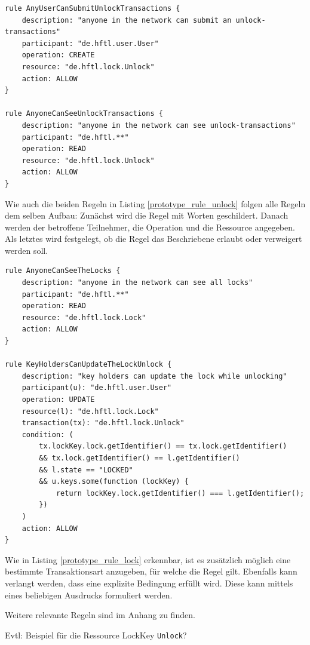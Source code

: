             \medskip
            \begin{lstlisting}[caption={Auszug aus den Regeln für die Transaktion \colorbox{light-gray}{\lstinline{Unlock}}},label=prototype_rule_unlock,captionpos=b]
rule AnyUserCanSubmitUnlockTransactions {
    description: "anyone in the network can submit an unlock-transactions"
    participant: "de.hftl.user.User"
    operation: CREATE
    resource: "de.hftl.lock.Unlock"
    action: ALLOW
}

rule AnyoneCanSeeUnlockTransactions {
    description: "anyone in the network can see unlock-transactions"
    participant: "de.hftl.**"
    operation: READ
    resource: "de.hftl.lock.Unlock"
    action: ALLOW
}
            \end{lstlisting}
            Wie auch die beiden Regeln in Listing \ref{prototype_rule_unlock} folgen alle Regeln dem selben Aufbau: Zunächst wird die Regel mit Worten geschildert. 
            Danach werden der betroffene Teilnehmer, die Operation und die Ressource angegeben.
            Als letztes wird festgelegt, ob die Regel das Beschriebene erlaubt oder verweigert werden soll. 
            \medskip
            \begin{lstlisting}[caption={Auszug aus den Regeln für die Ressource \colorbox{light-gray}{\lstinline{Lock}}},label=prototype_rule_lock,captionpos=b]
rule AnyoneCanSeeTheLocks {
    description: "anyone in the network can see all locks"
    participant: "de.hftl.**"
    operation: READ
    resource: "de.hftl.lock.Lock"
    action: ALLOW
}

rule KeyHoldersCanUpdateTheLockUnlock {
    description: "key holders can update the lock while unlocking"
    participant(u): "de.hftl.user.User"
    operation: UPDATE
    resource(l): "de.hftl.lock.Lock"
    transaction(tx): "de.hftl.lock.Unlock"
    condition: (
        tx.lockKey.lock.getIdentifier() == tx.lock.getIdentifier()
        && tx.lock.getIdentifier() == l.getIdentifier()
        && l.state == "LOCKED"
        && u.keys.some(function (lockKey) {
            return lockKey.lock.getIdentifier() === l.getIdentifier();
        })
    )
    action: ALLOW
}
            \end{lstlisting}
            Wie in Listing \ref{prototype_rule_lock} erkennbar, ist es zusätzlich möglich eine bestimmte Transaktionsart anzugeben, für welche die Regel gilt. 
            Ebenfalls kann verlangt werden, dass eine explizite Bedingung erfüllt wird. 
            Diese kann mittels eines beliebigen Ausdrucks formuliert werden.
            
            Weitere relevante Regeln sind im Anhang zu finden.
            
            Evtl: Beispiel für die Ressource LockKey \colorbox{light-gray}{\lstinline{Unlock}}?
